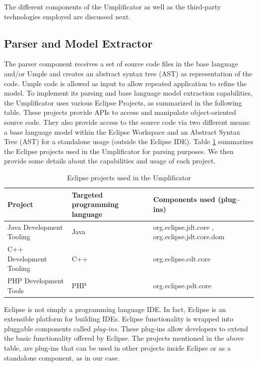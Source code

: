 The different components of the Umplificator as well as the third-party technologies employed are discussed next. 

\subsection{Parser and Model Extractor}

The parser component receives a set of source code files in the base language and/or Umple and creates an abstract syntax tree (AST) as representation of the code. Umple code is allowed as input to allow repeated application to refine the model. To implement its parsing and base language model extraction capabilities, the Umplificator uses various Eclipse Projects, as summarized in the following table. These projects provide APIs to access and manipulate object-oriented source code.
They also provide access to the  source code via two different means: a base language model within the Eclipse Workspace and an Abstract Syntax Tree (AST) for a standalone usage (outside the Eclipse IDE). Table \ref{table:xdtProjects} summarizes the Eclipse projects used in the Umplificator for parsing purposes. We then provide some details about the capabilities and usage of each project. 

\begin{table}[ht]
\caption{Eclipse projects used in the Umplificator}
\label{table:xdtProjects}
\begin{tabular}{l|p{4cm}p{5cm}}
\toprule
\rowcolor[HTML]{BBDAFF}
\textbf{Project} & \textbf{Targeted programming language}  & \textbf{Components used (plug--ins)}  \\ \hline
	Java Development Tooling & Java   & org.eclipse.jdt.core , org.eclipse.jdt.core.dom  \\ \hline
	C++ Development Tooling  & C++   & org.eclipse.cdt.core \\ \hline
	PHP Development Tools	 & PHP   & org.eclipse.pdt.core \\ \hline
\end{tabular}
\end{table}

Eclipse is not simply a programming language IDE. In fact,  Eclipse is an extensible platform for building IDEs. Eclipse functionality is wrapped into pluggable components called \textit{plug-ins}. These plug-ins allow developers to extend the basic functionality offered by Eclipse. The projects mentioned in the above table, are plug-ins that can be used in other projects inside Eclipse or as a standalone component, as in our case.

